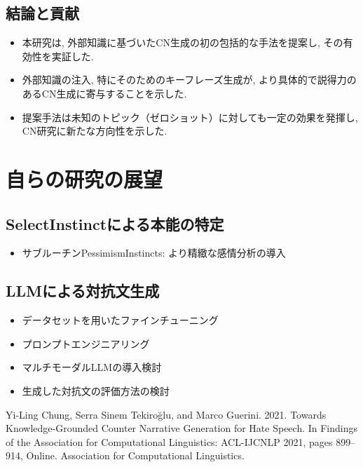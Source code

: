 \documentclass[dvipdfmx]{jsarticle}
\begin{document}
\vspace{0.5em}

\subsection{結論と貢献}

\begin{itemize}
  \item 本研究は, 外部知識に基づいたCN生成の初の包括的な手法を提案し, その有効性を実証した.
  \item 外部知識の注入, 特にそのためのキーフレーズ生成が, より具体的で説得力のあるCN生成に寄与することを示した.
  \item 提案手法は未知のトピック（ゼロショット）に対しても一定の効果を発揮し, CN研究に新たな方向性を示した.
\end{itemize}

\vspace{1em}

\section{自らの研究の展望}

\subsection{SelectInstinctによる本能の特定}

\begin{itemize}
  \item サブルーチンPessimismInstincts: より精緻な感情分析の導入
\end{itemize}

\vspace{0.5em}

\subsection{LLMによる対抗文生成}

\begin{itemize}
  \item データセットを用いたファインチューニング
  \item プロンプトエンジニアリング
  \item マルチモーダルLLMの導入検討
  \item 生成した対抗文の評価方法の検討
\end{itemize}

\vspace{1em}

\begin{thebibliography}{99}
  Yi-Ling Chung, Serra Sinem Tekiroğlu, and Marco Guerini. 2021. Towards Knowledge-Grounded Counter Narrative Generation for Hate Speech. In Findings of the Association for Computational Linguistics: ACL-IJCNLP 2021, pages 899–914, Online. Association for Computational Linguistics.

\end{thebibliography}
\end{document}
